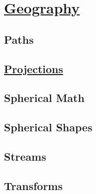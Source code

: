 \section{\href{https://github.com/d3/d3-geo}{Geography}}


\subsection*{Paths}



\subsection*{\href{https://github.com/d3/d3-geo-projection}{Projections}}



\subsection*{Spherical Math}



\subsection*{Spherical Shapes}



\subsection*{Streams}



\subsection*{Transforms}




